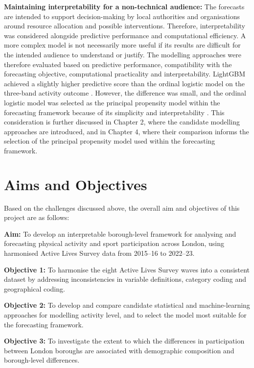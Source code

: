 \documentclass[ %
                    author={Ashrey Ashrey, Sanya Kapoor, Trisha Sharma, Yash Bhooshan Pandloskar},
                supervisor={Dr. Dalila O’Grady},
                    degree={MSc},
                     title={Using machine learning to forecast physical activity participation, volunteering and activity patterns in London},
                  subtitle={},
                      type={},
                      year={2021}]{dissertation}
\begin{document}
\textbf{Maintaining interpretability for a non-technical audience:}
The forecasts are intended to support decision-making by local authorities and organisations around resource allocation and possible interventions. Therefore, interpretability was considered alongside predictive performance and computational efficiency. A more complex model is not necessarily more useful if its results are difficult for the intended audience to understand or justify. The modelling approaches were therefore evaluated based on predictive performance, compatibility with the forecasting objective, computational practicality and interpretability. LightGBM achieved a slightly higher predictive score than the ordinal logistic model on the three-band activity outcome \cite{ke_etal_2017}. However, the difference was small, and the ordinal logistic model was selected as the principal propensity model within the forecasting framework because of its simplicity and interpretability \cite{mccullagh_1980}.
This consideration is further discussed in Chapter 2, where the candidate modelling approaches are introduced, and in Chapter 4, where their comparison informs the selection of the principal propensity model used within the forecasting framework.


\section{Aims and Objectives}

Based on the challenges discussed above, the overall aim and objectives of this project are as follows:

\textbf{Aim:} To develop an interpretable borough-level framework for analysing and forecasting physical activity and sport participation across London, using harmonised Active Lives Survey data from 2015--16 to 2022--23.

\textbf{Objective 1:} To harmonise the eight Active Lives Survey waves into a consistent dataset by addressing inconsistencies in variable definitions, category coding and geographical coding.

\textbf{Objective 2:} To develop and compare candidate statistical and machine-learning approaches for modelling activity level, and to select the model most suitable for the forecasting framework.

\textbf{Objective 3:} To investigate the extent to which the differences in participation between London boroughs are associated with demographic composition and borough-level differences.
\end{document}
